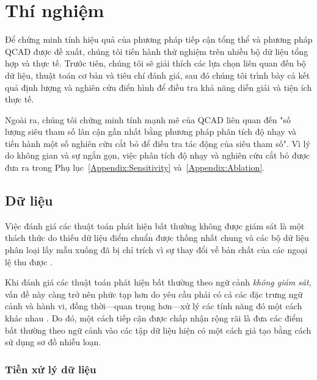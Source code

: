 \section{Thí nghiệm}
\label{sec:experiments}

Để chứng minh tính hiệu quả của phương pháp tiếp cận tổng thể và phương pháp QCAD được đề xuất, chúng tôi tiến hành thử nghiệm trên nhiều bộ dữ liệu tổng hợp và thực tế. Trước tiên, chúng tôi sẽ giải thích các lựa chọn liên quan đến bộ dữ liệu, thuật toán cơ bản và tiêu chí đánh giá, sau đó chúng tôi trình bày cả kết quả định lượng và nghiên cứu điển hình để điều tra khả năng diễn giải và tiện ích thực tế.

Ngoài ra, chúng tôi chứng minh tính mạnh mẽ của QCAD liên quan đến "số lượng siêu tham số lân cận gần nhất bằng phương pháp phân tích độ nhạy và tiến hành một số nghiên cứu cắt bỏ để điều tra tác động của siêu tham số". Vì lý do không gian và sự ngắn gọn, việc phân tích độ nhạy và
nghiên cứu cắt bỏ được đưa ra trong Phụ lục~\ref{Appendix:Sensitivity} và~\ref{Appendix:Ablation}.

\subsection{Dữ liệu}
\label{subsec:datasets}

Việc đánh giá các thuật toán phát hiện bất thường không được giám sát là một thách thức do thiếu dữ liệu điểm chuẩn được thống nhất chung và các bộ dữ liệu phân loại lấy mẫu xuống đã bị chỉ trích vì sự thay đổi về bản chất của các ngoại lệ thu được \citep{farber2010using,campos2016evaluation}.

Khi đánh giá các thuật toán phát hiện bất thường theo ngữ cảnh \emph{không giám sát}, vấn đề này càng trở nên phức tạp hơn do yêu cầu phải có cả các đặc trưng ngữ cảnh và hành vi, đồng thời---quan trọng hơn---xử lý các tính năng đó một cách khác nhau \citep{liang2016robust}. Do đó, một cách tiếp cận được chấp nhận rộng rãi là đưa các điểm bất thường theo ngữ cảnh vào các tập dữ liệu hiện có một cách giả tạo bằng cách sử dụng sơ đồ nhiễu loạn.

\subsubsection{Tiền xử lý dữ liệu}
\label{prelim:gower}

